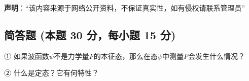 
\textbf{声明}：“该内容来源于网络公开资料，不保证真实性，如有侵权请联系管理员”

\subsection{简答题 (本题 30 分，每小题 15 分)}

① 如果波函数$\psi$不是力学量$F$的本征态，那么在态$\psi$中测量$F$会发生什么情况？

② 什么是定态？它有何特性？